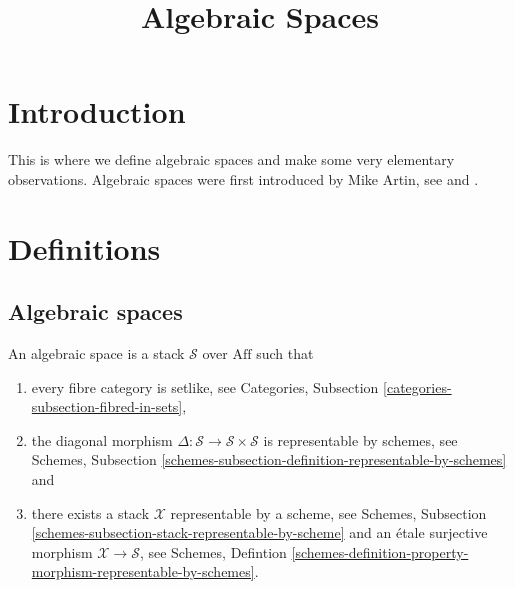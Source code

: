 

%


\title{Algebraic Spaces}


\maketitle

\tableofcontents

\section{Introduction}
\label{section-introduction}

\noindent
This is where we define algebraic spaces and make some very elementary
observations. Algebraic spaces were first introduced by Mike Artin,
see \cite{ArtinI} and \cite{ArtinII}.

\section{Definitions}
\label{section-definitions}

\subsection{Algebraic spaces}
\label{subsection-algebraic-spaces}

\begin{definition}
An algebraic space is a stack $\mathcal{S}$ over $\text{Aff}$ such that
\begin{enumerate}
\item every fibre category is setlike, see Categories,
Subsection \ref{categories-subsection-fibred-in-sets}, 
\item the diagonal morphism
$\Delta : \mathcal{S} \to \mathcal{S}\times\mathcal{S}$
is representable by schemes, see Schemes, Subsection
\ref{schemes-subsection-definition-representable-by-schemes} and
\item there exists a stack $\mathcal{X}$ representable by a scheme, see
Schemes, Subsection \ref{schemes-subsection-stack-representable-by-scheme}
and an \'etale surjective morphism $\mathcal{X} \to \mathcal{S}$,
see Schemes, Defintion
\ref{schemes-definition-property-morphism-representable-by-schemes}.
\end{enumerate}
\end{definition}

